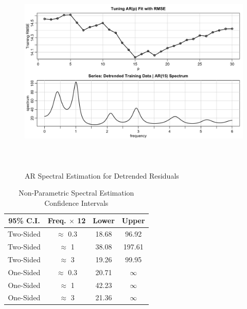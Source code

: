 \documentclass[10pt]{article}
\begin{document}
\begin{figure}[ht!]
    \centering
    \includegraphics[height=100mm, width=125mm]{tuning-AR-spec.png}
    \caption{AR Spectral Estimation for Detrended Residuals}
\end{figure}

\begin{table}[h!]
    \centering
    \begin{tabular}{| c | c | c | c |} 
    \hline
    95\% C.I. & Freq. $\times$ 12& Lower & Upper \\ 
    \hline
    \hline
    Two-Sided & $\approx$ 0.3 & 18.68 & 96.92\\
    \hline
    Two-Sided & $\approx$ 1 & 38.08 & 197.61\\
    \hline  
    Two-Sided & $\approx$ 3 & 19.26 & 99.95\\
    \hline  
    One-Sided & $\approx$ 0.3 & 20.71 & $\infty$\\
    \hline
    One-Sided & $\approx$ 1 & 42.23 & $\infty$\\
    \hline  
    One-Sided & $\approx$ 3 & 21.36 & $\infty$\\
    \hline  
    \end{tabular}
    \caption{Non-Parametric Spectral Estimation Confidence Intervals}
\end{table}
\end{document}
